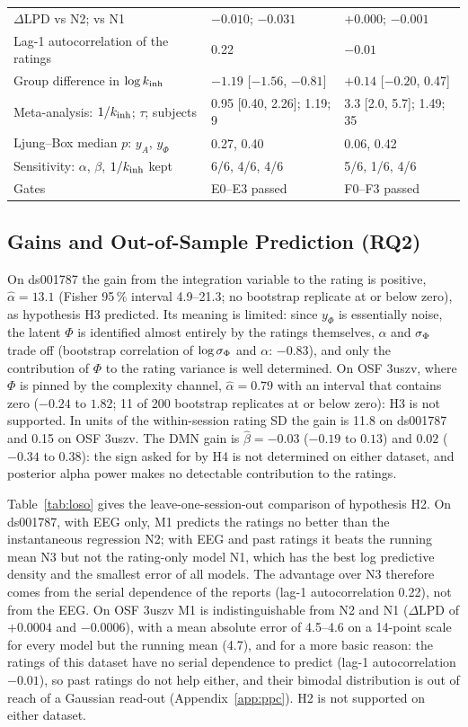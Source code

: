 \begin{table}[t]
\begin{tabular}{lll}
$\Delta$LPD vs N2; vs N1                 & $-0.010$; $-0.031$ & $+0.000$; $-0.001$ \\
Lag-1 autocorrelation of the ratings     & 0.22 & $-0.01$ \\
Group difference in $\log k_{\mathrm{inh}}$          & $-1.19$ [$-1.56$, $-0.81$] & $+0.14$ [$-0.20$, 0.47] \\
Meta-analysis: $1/k_{\mathrm{inh}}$; $\tau$; subjects & 0.95 [0.40, 2.26]; 1.19; 9 & 3.3 [2.0, 5.7]; 1.49; 35 \\
Ljung--Box median $p$: $y_A$, $y_\Phi$   & 0.27, 0.40 & 0.06, 0.42 \\
Sensitivity: $\alpha$, $\beta$, $1/k_{\mathrm{inh}}$ kept & 6/6, 4/6, 4/6 & 5/6, 1/6, 4/6 \\
Gates                                    & E0--E3 passed & F0--F3 passed \\
\bottomrule
\end{tabular}
\end{table}

\subsection{Gains and Out-of-Sample Prediction (RQ2)}
On ds001787 the gain from the integration variable to the rating is positive, $\hat\alpha=13.1$ (Fisher 95\,\% interval 4.9--21.3; no bootstrap replicate at or below zero), as hypothesis H3 predicted. Its meaning is limited: since $y_\Phi$ is essentially noise, the latent $\Phi$ is identified almost entirely by the ratings themselves, $\alpha$ and $\sigma_{\Phi}$ trade off (bootstrap correlation of $\log\sigma_{\Phi}$ and $\alpha$: $-0.83$), and only the contribution of $\Phi$ to the rating variance is well determined. On OSF 3uszv, where $\Phi$ is pinned by the complexity channel, $\hat\alpha=0.79$ with an interval that contains zero ($-0.24$ to $1.82$; 11 of 200 bootstrap replicates at or below zero): H3 is not supported. In units of the within-session rating SD the gain is 11.8 on ds001787 and 0.15 on OSF 3uszv. The DMN gain is $\hat\beta=-0.03$ ($-0.19$ to $0.13$) and $0.02$ ($-0.34$ to $0.38$): the sign asked for by H4 is not determined on either dataset, and posterior alpha power makes no detectable contribution to the ratings.

Table~\ref{tab:loso} gives the leave-one-session-out comparison of hypothesis H2. On ds001787, with EEG only, M1 predicts the ratings no better than the instantaneous regression N2; with EEG and past ratings it beats the running mean N3 but not the rating-only model N1, which has the best log predictive density and the smallest error of all models. The advantage over N3 therefore comes from the serial dependence of the reports (lag-1 autocorrelation 0.22), not from the EEG. On OSF 3uszv M1 is indistinguishable from N2 and N1 ($\Delta\mathrm{LPD}$ of $+0.0004$ and $-0.0006$), with a mean absolute error of 4.5--4.6 on a 14-point scale for every model but the running mean (4.7), and for a more basic reason: the ratings of this dataset have no serial dependence to predict (lag-1 autocorrelation $-0.01$), so past ratings do not help either, and their bimodal distribution is out of reach of a Gaussian read-out (Appendix~\ref{app:ppc}). H2 is not supported on either dataset.

